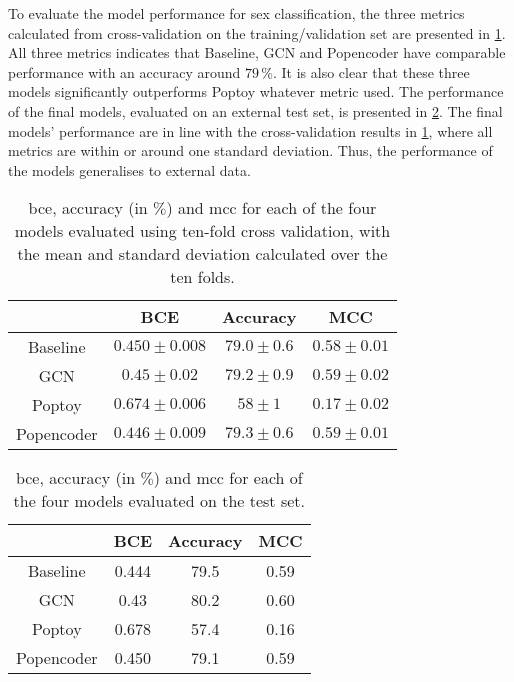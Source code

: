 To evaluate the model performance for sex classification, the three metrics calculated from cross-validation on the training/validation set are presented in \cref{tab:sex_model_results}. All three metrics indicates that Baseline, GCN and Popencoder have comparable performance with an accuracy around $79\,\%$. It is also clear that these three models significantly outperforms Poptoy whatever metric used. The performance of the final models, evaluated on an external test set, is presented in \cref{tab:sex_final_model_results}. The final models' performance are in line with the cross-validation results in \cref{tab:sex_model_results}, where all metrics are within or around one standard deviation. Thus, the performance of the models generalises to external data.
\begin{table}[!htbp]
    \centering
    \caption{\acrfull{bce}, accuracy (in $\%$) and \acrfull{mcc} for each of the four models evaluated using ten-fold cross validation, with the mean and standard deviation calculated over the ten folds.}    
    \begin{tabular}{c|c|c|c}
         & BCE & Accuracy & MCC\\ \hline
        Baseline & $0.450\pm0.008$ & $79.0\pm0.6$ &$0.58\pm 0.01$\\
        GCN &$0.45\pm0.02$ & $79.2\pm0.9$& $0.59\pm0.02$\\
        Poptoy &$0.674\pm 0.006$ & $58\pm1$ &$0.17\pm0.02$\\
        Popencoder &$0.446\pm0.009$& $79.3\pm 0.6$ & $0.59\pm0.01$\\
    \end{tabular}
    \label{tab:sex_model_results}
\end{table}
\begin{table}[!htbp]
    \centering
    \caption{\acrfull{bce}, accuracy (in $\%$) and \acrfull{mcc} for each of the four models evaluated on the test set.}
    \begin{tabular}{c|c|c|c}
         & BCE & Accuracy & MCC\\ \hline
        Baseline & 0.444 & 79.5 &0.59\\
        GCN & 0.43& 80.2 & 0.60 \\
        Poptoy &0.678 &57.4 &0.16\\
        Popencoder & 0.450 & 79.1& 0.59\\
    \end{tabular}
    \label{tab:sex_final_model_results}
\end{table}

